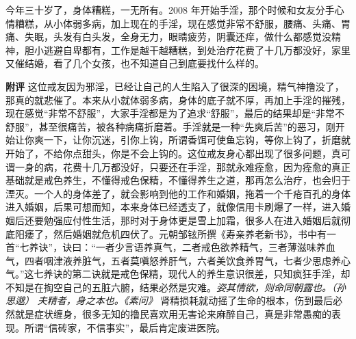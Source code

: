 \begin{case}
    今年三十岁了，身体糟糕，一无所有。2008 年开始手淫，那个时候和女友分手心情糟糕，从小体弱多病，加上现在的手淫，现在感觉非常不舒服，腰痛、头痛、胃痛、失眠，头发有白头发，全身无力，眼睛疲劳，阴囊还痒，做什么都感觉没精神，胆小逃避自卑都有，工作是越干越糟糕，到处治疗花费了十几万都没好，家里又催结婚，看了几个女孩，也不知道自己到底要找什么样的。

    \textbf{附评} 这位戒友因为邪淫，已经让自己的人生陷入了很深的困境，精气神撸没了，那真的就悲催了。本来从小就体弱多病，身体的底子就不厚，再加上手淫的摧残，现在感觉“非常不舒服”，大家手淫都是为了追求“舒服”，最后的结果却是“非常不舒服”，甚至很痛苦，被各种病痛折磨着。手淫就是一种“先爽后苦”的恶习，刚开始让你爽一下，让你沉迷，引你上钩，所谓香饵可使鱼忘钩，等你上钩了，折磨就开始了，不给你点甜头，你是不会上钩的。这位戒友身心都出现了很多问题，真可谓一身的病，花费十几万都没好，只要还在手淫，那就永难痊愈，因为痊愈的真正基础就是戒色养生，不懂得戒色保精，不懂得养生之道，那再怎么治疗，也会归于湮灭。一个人的身体差了，就会影响到他的工作和婚姻，拖着一个千疮百孔的身体进入婚姻，后果可想而知，本来身体已经透支了，就像信用卡刷爆了一样，进入婚姻后还要勉强应付性生活，那时对于身体更是雪上加霜，很多人在进入婚姻后就彻底阳痿了，然后婚姻就危机四伏了。元朝邹铉所撰《寿亲养老新书》，书中有一首“七养诀”，诀曰：“一者少言语养真气，二者戒色欲养精气，三者薄滋味养血气，四者咽津液养脏气，五者莫嗔怒养肝气，六者美饮食养胃气，七者少思虑养心气。”这七养诀的第二诀就是戒色保精，现代人的养生意识很差，只知疯狂手淫，却不知是在掏空自己的五脏六腑，结果必然是灾难。\textit{姿其情欲，则命同朝露也。（孙思邈）} \textit{夫精者，身之本也。《素问》} 肾精损耗就动摇了生命的根本，伤到最后必然就是症状缠身，很多无知的撸民喜欢用无害论来麻醉自己，真是非常愚痴的表现。所谓“信砖家，不信事实”，最后肯定废进医院。
\end{case}

